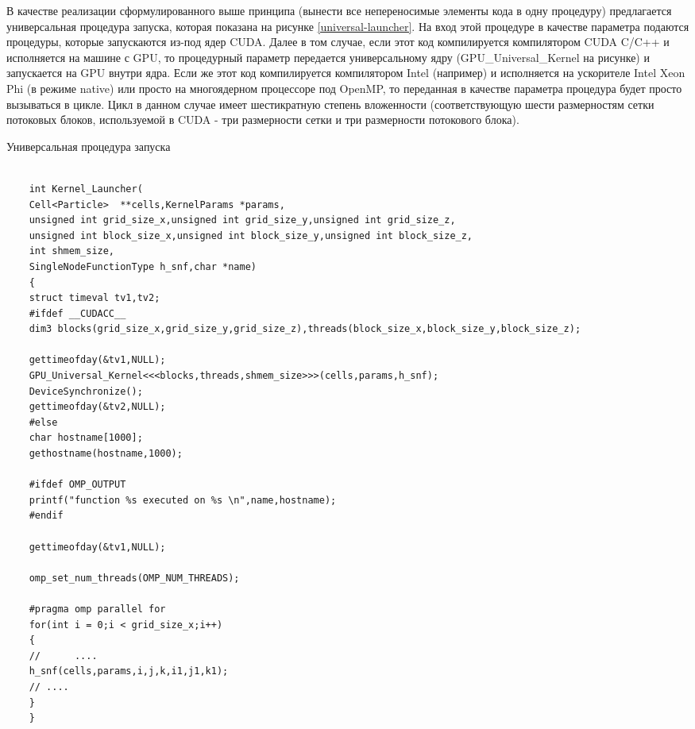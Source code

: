 В качестве реализации сформулированного выше принципа (вынести все непереносимые элементы кода в одну процедуру) предлагается универсальная процедура запуска, которая показана на рисунке \ref{universal-launcher}. На вход этой процедуре в качестве параметра подаются процедуры, которые запускаются из-под ядер CUDA. Далее в том случае, если этот код компилируется компилятором CUDA C/C++ и исполняется на машине с GPU, то процедурный параметр передается универсальному ядру (GPU\_Universal\_Kernel на рисунке) и запускается на GPU внутри ядра. Если же этот код компилируется компилятором Intel (например) и исполняется
на ускорителе Intel Xeon Phi (в режиме native) или просто на многоядерном процессоре под OpenMP, то переданная в качестве параметра процедура будет просто вызываться в цикле. Цикл в данном случае имеет шестикратную степень вложенности (соответствующую шести размерностям сетки потоковых блоков, используемой в CUDA - три размерности сетки и три размерности потокового блока).
\begin{ListingEnv}[!h]
	\captiondelim{ } %
	\caption{Универсальная процедура запуска}
	\label{universal-launcher}	
	\begin{lstlisting}[language={[ISO]C++}]
	
	int Kernel_Launcher(
	Cell<Particle>  **cells,KernelParams *params,
	unsigned int grid_size_x,unsigned int grid_size_y,unsigned int grid_size_z,
	unsigned int block_size_x,unsigned int block_size_y,unsigned int block_size_z,
	int shmem_size,
	SingleNodeFunctionType h_snf,char *name)
	{
	struct timeval tv1,tv2;
	#ifdef __CUDACC__
	dim3 blocks(grid_size_x,grid_size_y,grid_size_z),threads(block_size_x,block_size_y,block_size_z);
	
	gettimeofday(&tv1,NULL);
	GPU_Universal_Kernel<<<blocks,threads,shmem_size>>>(cells,params,h_snf);
	DeviceSynchronize();
	gettimeofday(&tv2,NULL);
	#else
	char hostname[1000];
	gethostname(hostname,1000);
	
	#ifdef OMP_OUTPUT
	printf("function %s executed on %s \n",name,hostname);
	#endif
	
	gettimeofday(&tv1,NULL);
	
	omp_set_num_threads(OMP_NUM_THREADS);
	
	#pragma omp parallel for
	for(int i = 0;i < grid_size_x;i++)
	{
	//      ....              
	h_snf(cells,params,i,j,k,i1,j1,k1);
	// ....
	}
	}
	\end{lstlisting}
\end{ListingEnv}

